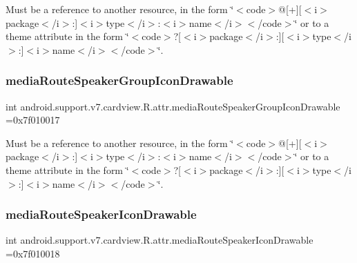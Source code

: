 Must be a reference to another resource, in the form \char`\"{}$<$code$>$@\mbox{[}+\mbox{]}\mbox{[}$<$i$>$package$<$/i$>$\+:\mbox{]}$<$i$>$type$<$/i$>$\+:$<$i$>$name$<$/i$>$$<$/code$>$\char`\"{} or to a theme attribute in the form \char`\"{}$<$code$>$?\mbox{[}$<$i$>$package$<$/i$>$\+:\mbox{]}\mbox{[}$<$i$>$type$<$/i$>$\+:\mbox{]}$<$i$>$name$<$/i$>$$<$/code$>$\char`\"{}. \mbox{\label{classandroid_1_1support_1_1v7_1_1cardview_1_1R_1_1attr_a3761f53c1f4730800c58e932feb383fa}} 
\subsubsection{\texorpdfstring{media\+Route\+Speaker\+Group\+Icon\+Drawable}{mediaRouteSpeakerGroupIconDrawable}}
{\footnotesize\ttfamily int android.\+support.\+v7.\+cardview.\+R.\+attr.\+media\+Route\+Speaker\+Group\+Icon\+Drawable =0x7f010017\hspace{0.3cm}{\ttfamily [static]}}

Must be a reference to another resource, in the form \char`\"{}$<$code$>$@\mbox{[}+\mbox{]}\mbox{[}$<$i$>$package$<$/i$>$\+:\mbox{]}$<$i$>$type$<$/i$>$\+:$<$i$>$name$<$/i$>$$<$/code$>$\char`\"{} or to a theme attribute in the form \char`\"{}$<$code$>$?\mbox{[}$<$i$>$package$<$/i$>$\+:\mbox{]}\mbox{[}$<$i$>$type$<$/i$>$\+:\mbox{]}$<$i$>$name$<$/i$>$$<$/code$>$\char`\"{}. \mbox{\label{classandroid_1_1support_1_1v7_1_1cardview_1_1R_1_1attr_a00e185878f53f530a81fc5510b692f32}} 
\subsubsection{\texorpdfstring{media\+Route\+Speaker\+Icon\+Drawable}{mediaRouteSpeakerIconDrawable}}
{\footnotesize\ttfamily int android.\+support.\+v7.\+cardview.\+R.\+attr.\+media\+Route\+Speaker\+Icon\+Drawable =0x7f010018\hspace{0.3cm}{\ttfamily [static]}}

